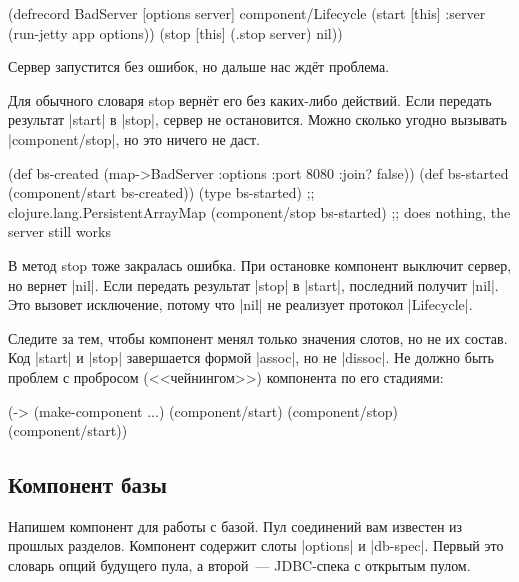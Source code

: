 \begin{english}
  \begin{clojure}
(defrecord BadServer [options server]
  component/Lifecycle
  (start [this]
    {:server (run-jetty app options)})
  (stop [this]
    (.stop server)
    nil))
  \end{clojure}
\end{english}

Сервер запустится без ошибок, но дальше нас жд\"{е}т проблема.

Для обычного словаря stop верн\"{е}т его без каких-либо действий. Если передать
результат \spverb|start| в \spverb|stop|, сервер не остановится. Можно сколько
угодно вызывать \spverb|component/stop|, но это ничего не даст.

\begin{english}
  \begin{clojure}
(def bs-created (map->BadServer
                  {:options {:port 8080 :join? false}}))
(def bs-started (component/start bs-created))
(type bs-started)
;; clojure.lang.PersistentArrayMap
(component/stop bs-started)
;; does nothing, the server still works
  \end{clojure}
\end{english}

В метод stop тоже закралась ошибка. При остановке компонент выключит сервер, но
вернет \spverb|nil|. Если передать результат \spverb|stop| в \spverb|start|,
последний получит \spverb|nil|. Это вызовет исключение, потому что \spverb|nil|
не реализует протокол \spverb|Lifecycle|.

Следите за тем, чтобы компонент менял только значения слотов, но не их
состав. Код \spverb|start| и \spverb|stop| завершается формой \spverb|assoc|, но
не \spverb|dissoc|. Не должно быть проблем с пробросом (<<чейнингом>>)
компонента по его стадиями:

\begin{english}
  \begin{clojure}
(-> (make-component {...})
    (component/start)
    (component/stop)
    (component/start))
  \end{clojure}
\end{english}

\subsection{Компонент базы}

Напишем компонент для работы с базой. Пул соединений вам известен из прошлых
разделов. Компонент содержит слоты \spverb|options| и \spverb|db-spec|. Первый
это словарь опций будущего пула, а второй~--- JDBC-спека с открытым пулом.

